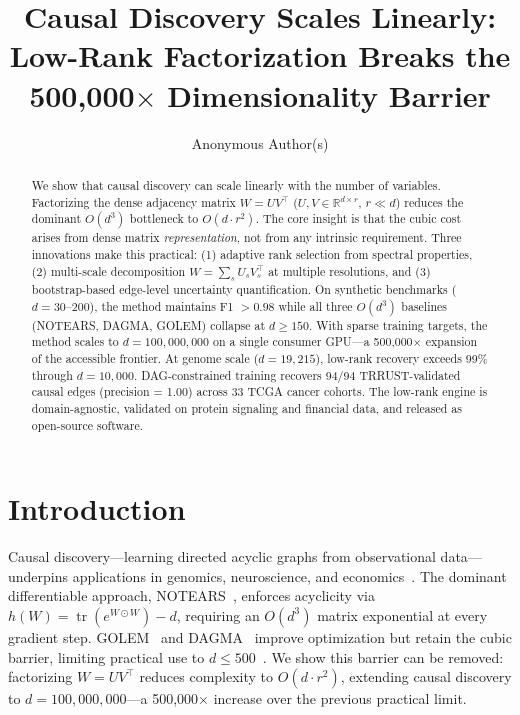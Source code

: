 \documentclass{article}
\title{Causal Discovery Scales Linearly: Low-Rank Factorization Breaks the 500,000$\times$ Dimensionality Barrier}
\author{Anonymous Author(s)}
\theoremstyle{definition}
\begin{document}
\maketitle

\begin{abstract}
We show that causal discovery can scale linearly with the number of variables. Factorizing the dense adjacency matrix $W = U V^\top$ ($U, V \in \mathbb{R}^{d \times r}$, $r \ll d$) reduces the dominant $O(d^3)$ bottleneck to $O(d \cdot r^2)$. The core insight is that the cubic cost arises from dense matrix \emph{representation}, not from any intrinsic requirement. Three innovations make this practical: (1) adaptive rank selection from spectral properties, (2) multi-scale decomposition $W = \sum_s U_s V_s^\top$ at multiple resolutions, and (3) bootstrap-based edge-level uncertainty quantification. On synthetic benchmarks ($d=30$--$200$), the method maintains F1 $> 0.98$ while all three $O(d^3)$ baselines (NOTEARS, DAGMA, GOLEM) collapse at $d \ge 150$. With sparse training targets, the method scales to $d=100{,}000{,}000$ on a single consumer GPU---a 500,000$\times$ expansion of the accessible frontier. At genome scale ($d=19{,}215$), low-rank recovery exceeds 99\% through $d=10{,}000$. DAG-constrained training recovers 94/94 TRRUST-validated causal edges (precision = 1.00) across 33 TCGA cancer cohorts. The low-rank engine is domain-agnostic, validated on protein signaling and financial data, and released as open-source software.
\end{abstract}

\section{Introduction}

Causal discovery---learning directed acyclic graphs from observational data---underpins applications in genomics, neuroscience, and economics~\citep{sachs2005causal,friedman2000using,runge2019detecting,pearl2009causality}. The dominant differentiable approach, NOTEARS~\citep{zheng2018dags}, enforces acyclicity via $h(W) = \operatorname{tr}(e^{W \odot W}) - d$, requiring an $O(d^3)$ matrix exponential at every gradient step. GOLEM~\citep{ng2020golem} and DAGMA~\citep{bello2022dagma} improve optimization but retain the cubic barrier, limiting practical use to $d \le 500$~\citep{spirtes2000causation,chickering2002optimal}. We show this barrier can be removed: factorizing $W = U V^\top$ reduces complexity to $O(d \cdot r^2)$, extending causal discovery to $d=100{,}000{,}000$---a 500,000$\times$ increase over the previous practical limit.
\end{document}
